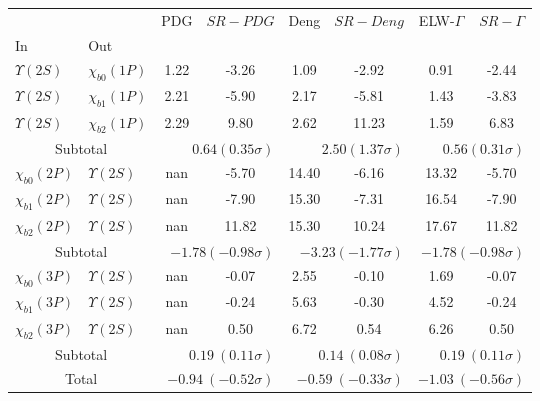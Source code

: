\begin{tabular}{|l|l|c|c|c|c|c|c|}%
\hline%
&&PDG&$SR-PDG$&Deng&$SR-Deng$&ELW-$\Gamma$&$SR-\Gamma$\\%
In&Out&&&&&&\\%
\hline%
$\Upsilon(2S)$&$\chi_{b0}(1P)$&1.22&-3.26&1.09&-2.92&0.91&-2.44\\%
$\Upsilon(2S)$&$\chi_{b1}(1P)$&2.21&-5.90&2.17&-5.81&1.43&-3.83\\%
$\Upsilon(2S)$&$\chi_{b2}(1P)$&2.29&9.80&2.62&11.23&1.59&6.83\\%
\hline%
\hline%
\multicolumn{2}{|c|}{Subtotal}&\multicolumn{2}{|r|}{$0.64 (0.35\sigma)$}&\multicolumn{2}{|r|}{$2.50 (1.37\sigma)$}&\multicolumn{2}{|r|}{$0.56 (0.31\sigma)$}\\%
\hline%
\hline%
$\chi_{b0}(2P)$&$\Upsilon(2S)$&nan&-5.70&14.40&-6.16&13.32&-5.70\\%
$\chi_{b1}(2P)$&$\Upsilon(2S)$&nan&-7.90&15.30&-7.31&16.54&-7.90\\%
$\chi_{b2}(2P)$&$\Upsilon(2S)$&nan&11.82&15.30&10.24&17.67&11.82\\%
\hline%
\hline%
\multicolumn{2}{|c|}{Subtotal}&\multicolumn{2}{|r|}{$-1.78 (-0.98\sigma)$}&\multicolumn{2}{|r|}{$-3.23 (-1.77\sigma)$}&\multicolumn{2}{|r|}{$-1.78 (-0.98\sigma)$}\\%
\hline%
\hline%
$\chi_{b0}(3P)$&$\Upsilon(2S)$&nan&-0.07&2.55&-0.10&1.69&-0.07\\%
$\chi_{b1}(3P)$&$\Upsilon(2S)$&nan&-0.24&5.63&-0.30&4.52&-0.24\\%
$\chi_{b2}(3P)$&$\Upsilon(2S)$&nan&0.50&6.72&0.54&6.26&0.50\\%
\hline%
\hline%
\multicolumn{2}{|c|}{Subtotal}&\multicolumn{2}{|r|}{$0.19~(0.11\sigma)$}&\multicolumn{2}{|r|}{$0.14~(0.08\sigma)$}&\multicolumn{2}{|r|}{$0.19~(0.11\sigma)$}\\%
\hline%
\hline%
\multicolumn{2}{|c|}{Total}&\multicolumn{2}{|r|}{$-0.94~(-0.52\sigma)$}&\multicolumn{2}{|r|}{$-0.59~(-0.33\sigma)$}&\multicolumn{2}{|r|}{$-1.03~(-0.56\sigma)$}\\%
\hline%
\end{tabular}